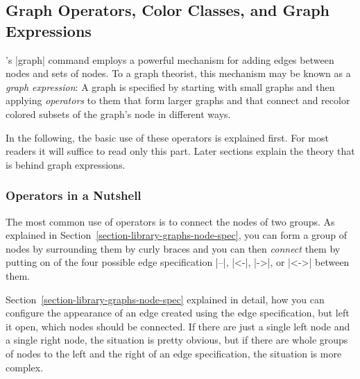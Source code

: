 \subsection{Graph Operators, Color Classes, and Graph Expressions}
\label{section-library-graphs-color-classes}

\tikzname's |graph| command employs a powerful mechanism for
adding edges between nodes and sets of nodes. To a graph theorist,
this mechanism may be known as a \emph{graph expression}: A graph is
specified by starting with small graphs and then applying
\emph{operators} to them that form larger graphs and that connect and
recolor colored subsets of the graph's node in different ways. 

In the following, the basic use of these operators is explained
first. For most readers it will suffice to read only this part. Later
sections explain the theory that is behind graph expressions.


\subsubsection{Operators in a Nutshell}

The most common use of operators is to connect the nodes of two 
groups. As explained in
Section~\ref{section-library-graphs-node-spec}, you can form a group 
of nodes by surrounding them by curly braces and you can then
\emph{connect} them by putting on of the four possible edge
specification |--|, |<-|, |->|, or |<->| between them. 

Section~\ref{section-library-graphs-node-spec} explained in detail,
how you can configure the appearance of an edge created using the edge
specification, but left it open, which nodes should be connected. If
there are just a single left node and a single right node, the
situation is pretty obvious, but if there are whole groups of nodes to
the left and the right of an edge specification, the situation is more
complex.

